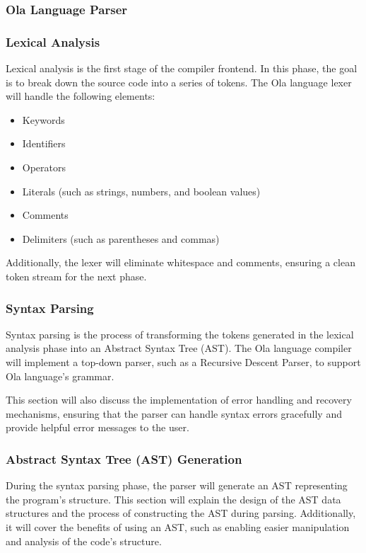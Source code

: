 
\subsubsection{Ola Language Parser}
\subsubsection*{Lexical Analysis}
Lexical analysis is the first stage of the compiler frontend. In this phase, the goal is to break down the source code into a series of tokens. The Ola language lexer will handle the following elements:
\begin{itemize}
\item Keywords
\item Identifiers
\item Operators
\item Literals (such as strings, numbers, and boolean values)
\item Comments
\item Delimiters (such as parentheses and commas)
\end{itemize}
Additionally, the lexer will eliminate whitespace and comments, ensuring a clean token stream for the next phase.

\subsubsection*{Syntax Parsing}
Syntax parsing is the process of transforming the tokens generated in the lexical analysis phase into an Abstract Syntax Tree (AST). The Ola language compiler will implement a top-down parser, such as a Recursive Descent Parser, to support Ola language's grammar.

This section will also discuss the implementation of error handling and recovery mechanisms, ensuring that the parser can handle syntax errors gracefully and provide helpful error messages to the user.

\subsubsection*{Abstract Syntax Tree (AST) Generation}
During the syntax parsing phase, the parser will generate an AST representing the program's structure. This section will explain the design of the AST data structures and the process of constructing the AST during parsing. Additionally, it will cover the benefits of using an AST, such as enabling easier manipulation and analysis of the code's structure.

